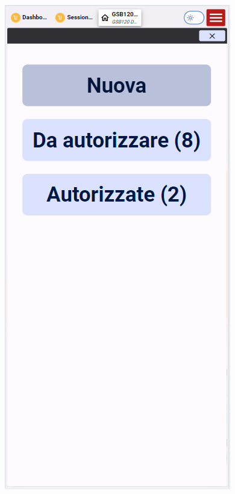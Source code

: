 \documentclass[target=bach,aauheader=,style=]{thud}
\begin{document}
\begin{figure}[H]
    \centering
    \begin{minipage}{0.25\textwidth}
        \centering
        \includegraphics[width=\linewidth]{screenshot/mobile GSA080.png}

\end{minipage}
\end{figure}
\end{document}
